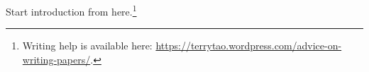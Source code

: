
Start introduction from here.\footnote{Writing help is available here: \url{https://terrytao.wordpress.com/advice-on-writing-papers/}.}